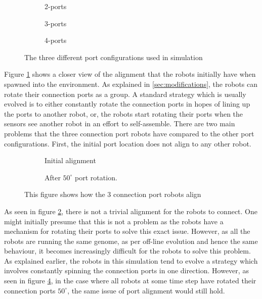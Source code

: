 \begin{figure}[H]
	\centering
	\begin{subfigure}[b]{0.31\textwidth}
		\centering
		\caption{2-ports}
	\end{subfigure}
	\begin{subfigure}[b]{0.31\textwidth}
		\centering
		\caption{3-ports}
	\end{subfigure}
	\begin{subfigure}[b]{0.31\textwidth}
		\centering
		\caption{4-ports}
	\end{subfigure}
	\caption{The three different port configurations used in simulation}
	\label{fig:robot-port-configuration}
\end{figure}

Figure \ref{fig:robot-port-configuration} shows a closer view of the alignment that the robots initially have when spawned into the environment.
As explained in \ref{sec:modifications}, the robots can rotate their connection ports as a group.
A standard strategy which is usually evolved is to either constantly rotate the connection ports in hopes of lining up the ports to another robot, or, the robots start rotating their ports when the sensors see another robot in an effort to self-assemble.
There are two main problems that the three connection port robots have compared to the other port configurations.
First, the initial port location does not align to any other robot.


\begin{figure}[H]
	\begin{subfigure}[t]{0.49\textwidth}
		\centering
		\caption{Initial alignment}
		\label{3-port-guided-allignment}
	\end{subfigure}
	\begin{subfigure}[t]{0.49\textwidth}
		\centering
		\caption{After $50^{\circ}$ port rotation.}
		\label{3-port-guided-allignment-offset}
	\end{subfigure}
	\caption{This figure shows how the 3 connection port robots align}
\end{figure}


As seen in figure \ref{3-port-guided-allignment}, there is not a trivial alignment for the robots to connect.
One might initially presume that this is not a problem as the robots have a mechanism for rotating their ports to solve this exact issue.
However, as all the robots are running the same genome, as per off-line evolution and hence the same behaviour, it becomes increasingly difficult for the robots to solve this problem.
As explained earlier, the robots in this simulation tend to evolve a strategy which involves constantly spinning the connection ports in one direction.
However, as seen in figure \ref{3-port-guided-allignment-offset}, in the case where all robots at some time step have rotated their connection ports $50^{\circ}$, the same issue of port alignment would still hold.

